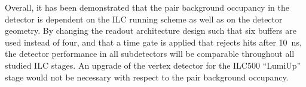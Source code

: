 Overall, it has been demonstrated that the pair background occupancy in the \sid detector is dependent on the ILC running scheme as well as on the \sid detector geometry.
By changing the \sid readout architecture design such that six buffers are used instead of four, and that a time gate is applied that rejects hits after \SI{10}{\nano\second}, the detector performance in all subdetectors will be comparable throughout all studied ILC stages.
An upgrade of the vertex detector for the ILC500 ``LumiUp'' stage would not be necessary with respect to the pair background occupancy.